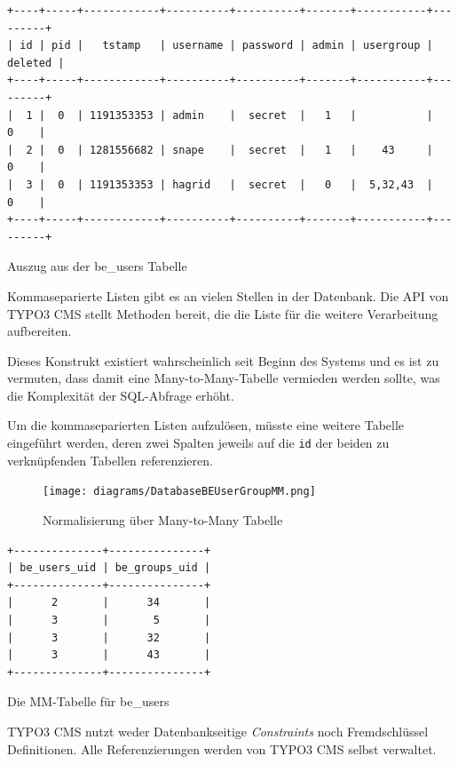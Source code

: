\begin{table}[H]
\begin{Verbatim}[samepage=true]
+----+-----+------------+----------+----------+-------+-----------+---------+
| id | pid |   tstamp   | username | password | admin | usergroup | deleted |
+----+-----+------------+----------+----------+-------+-----------+---------+
|  1 |  0  | 1191353353 | admin    |  secret  |   1   |           |    0    |
|  2 |  0  | 1281556682 | snape    |  secret  |   1   |    43     |    0    |
|  3 |  0  | 1191353353 | hagrid   |  secret  |   0   |  5,32,43  |    0    |
+----+-----+------------+----------+----------+-------+-----------+---------+
\end{Verbatim}
\caption{Auszug aus der be\_users Tabelle}
\label{tab:tableBeUser}
\end{table}

Kommaseparierte Listen gibt es an vielen Stellen in der Datenbank. Die API von TYPO3 CMS stellt Methoden bereit, die die Liste für die weitere Verarbeitung aufbereiten.

Dieses Konstrukt existiert wahrscheinlich seit Beginn des Systems und es ist zu vermuten, dass damit eine Many-to-Many-Tabelle vermieden werden sollte, was die Komplexität der SQL-Abfrage erhöht.

Um die kommaseparierten Listen aufzulösen, müsste eine weitere Tabelle eingeführt werden, deren zwei Spalten jeweils auf die \texttt{id} der beiden zu verknüpfenden Tabellen referenzieren.

\begin{figure}[H]
	\centering
	\texttt{[image: diagrams/DatabaseBEUserGroupMM.png]}
	\caption{Normalisierung über Many-to-Many Tabelle}
	\label{fig:beUsersHasBeGroups}
\end{figure}

\begin{table}[H]
\begin{Verbatim}[samepage=true]
+--------------+---------------+
| be_users_uid | be_groups_uid |
+--------------+---------------+
|      2       |      34       |
|      3       |       5       |
|      3       |      32       |
|      3       |      43       |
+--------------+---------------+
\end{Verbatim}
\caption{Die MM-Tabelle für be\_users}
\label{tab:mmTableBeUser}
\end{table}

TYPO3 CMS nutzt weder Datenbankseitige \textit{Constraints} noch Fremdschlüssel Definitionen. Alle Referenzierungen werden von TYPO3 CMS selbst verwaltet.
